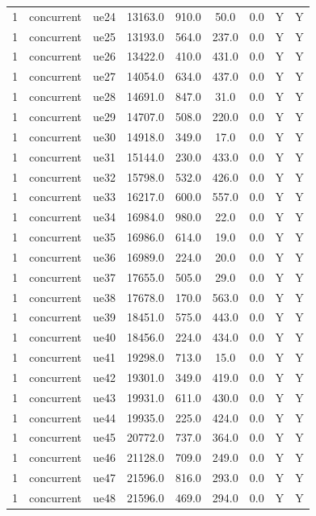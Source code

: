 \begin{table}[ht]
\begin{tabular}{|c|c|c|c|c|c|c|c|c|}
1 & concurrent & ue24 & 13163.0 & 910.0 & 50.0 & 0.0 & Y & Y \\
1 & concurrent & ue25 & 13193.0 & 564.0 & 237.0 & 0.0 & Y & Y \\
1 & concurrent & ue26 & 13422.0 & 410.0 & 431.0 & 0.0 & Y & Y \\
1 & concurrent & ue27 & 14054.0 & 634.0 & 437.0 & 0.0 & Y & Y \\
1 & concurrent & ue28 & 14691.0 & 847.0 & 31.0 & 0.0 & Y & Y \\
1 & concurrent & ue29 & 14707.0 & 508.0 & 220.0 & 0.0 & Y & Y \\
1 & concurrent & ue30 & 14918.0 & 349.0 & 17.0 & 0.0 & Y & Y \\
1 & concurrent & ue31 & 15144.0 & 230.0 & 433.0 & 0.0 & Y & Y \\
1 & concurrent & ue32 & 15798.0 & 532.0 & 426.0 & 0.0 & Y & Y \\
1 & concurrent & ue33 & 16217.0 & 600.0 & 557.0 & 0.0 & Y & Y \\
1 & concurrent & ue34 & 16984.0 & 980.0 & 22.0 & 0.0 & Y & Y \\
1 & concurrent & ue35 & 16986.0 & 614.0 & 19.0 & 0.0 & Y & Y \\
1 & concurrent & ue36 & 16989.0 & 224.0 & 20.0 & 0.0 & Y & Y \\
1 & concurrent & ue37 & 17655.0 & 505.0 & 29.0 & 0.0 & Y & Y \\
1 & concurrent & ue38 & 17678.0 & 170.0 & 563.0 & 0.0 & Y & Y \\
1 & concurrent & ue39 & 18451.0 & 575.0 & 443.0 & 0.0 & Y & Y \\
1 & concurrent & ue40 & 18456.0 & 224.0 & 434.0 & 0.0 & Y & Y \\
1 & concurrent & ue41 & 19298.0 & 713.0 & 15.0 & 0.0 & Y & Y \\
1 & concurrent & ue42 & 19301.0 & 349.0 & 419.0 & 0.0 & Y & Y \\
1 & concurrent & ue43 & 19931.0 & 611.0 & 430.0 & 0.0 & Y & Y \\
1 & concurrent & ue44 & 19935.0 & 225.0 & 424.0 & 0.0 & Y & Y \\
1 & concurrent & ue45 & 20772.0 & 737.0 & 364.0 & 0.0 & Y & Y \\
1 & concurrent & ue46 & 21128.0 & 709.0 & 249.0 & 0.0 & Y & Y \\
1 & concurrent & ue47 & 21596.0 & 816.0 & 293.0 & 0.0 & Y & Y \\
1 & concurrent & ue48 & 21596.0 & 469.0 & 294.0 & 0.0 & Y & Y \\

\end{tabular}
\end{table}
